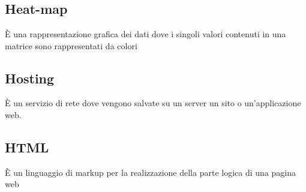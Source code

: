 \section{}
\subsection*{Heat-map} È una rappresentazione grafica dei dati dove i singoli valori contenuti in una matrice sono rappresentati da colori
\subsection*{Hosting} È un servizio di rete dove vengono salvate su un server un sito o un'applicazione web.
\subsection*{HTML} È un linguaggio di markup per la realizzazione della parte logica di una pagina web